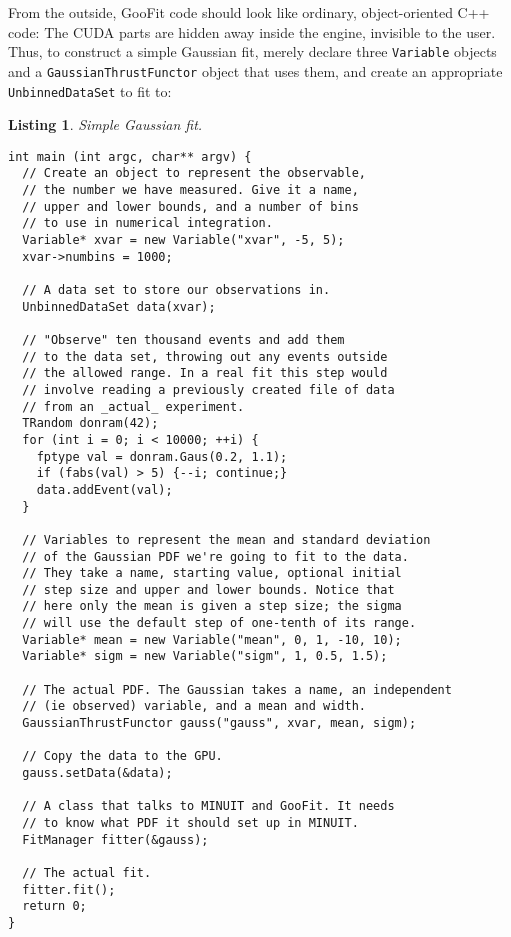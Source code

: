 \documentclass[12pt,pdflatex]{article}
\newtheorem{listing}{Listing}
\begin{document}
From the outside, GooFit code should look like ordinary,
object-oriented C++ code: The CUDA parts are hidden away
inside the engine, invisible to the user. Thus, to construct
a simple Gaussian fit, merely declare three \texttt{Variable}
objects and a \texttt{GaussianThrustFunctor} object that uses them,
and create an appropriate \texttt{UnbinnedDataSet} to fit to:
\begin{listing}
\label{listing:gaussfit}
Simple Gaussian fit.

\begin{verbatim}
int main (int argc, char** argv) {
  // Create an object to represent the observable, 
  // the number we have measured. Give it a name,
  // upper and lower bounds, and a number of bins
  // to use in numerical integration. 
  Variable* xvar = new Variable("xvar", -5, 5); 
  xvar->numbins = 1000; 

  // A data set to store our observations in.
  UnbinnedDataSet data(xvar);

  // "Observe" ten thousand events and add them
  // to the data set, throwing out any events outside
  // the allowed range. In a real fit this step would
  // involve reading a previously created file of data
  // from an _actual_ experiment. 
  TRandom donram(42); 
  for (int i = 0; i < 10000; ++i) {
    fptype val = donram.Gaus(0.2, 1.1);
    if (fabs(val) > 5) {--i; continue;} 
    data.addEvent(val); 
  }

  // Variables to represent the mean and standard deviation
  // of the Gaussian PDF we're going to fit to the data.
  // They take a name, starting value, optional initial 
  // step size and upper and lower bounds. Notice that
  // here only the mean is given a step size; the sigma
  // will use the default step of one-tenth of its range.
  Variable* mean = new Variable("mean", 0, 1, -10, 10);
  Variable* sigm = new Variable("sigm", 1, 0.5, 1.5); 

  // The actual PDF. The Gaussian takes a name, an independent
  // (ie observed) variable, and a mean and width. 
  GaussianThrustFunctor gauss("gauss", xvar, mean, sigm); 

  // Copy the data to the GPU. 
  gauss.setData(&data);

  // A class that talks to MINUIT and GooFit. It needs
  // to know what PDF it should set up in MINUIT. 
  FitManager fitter(&gauss); 

  // The actual fit. 
  fitter.fit(); 
  return 0;
}
\end{verbatim}
\end{listing} 
\end{document}
